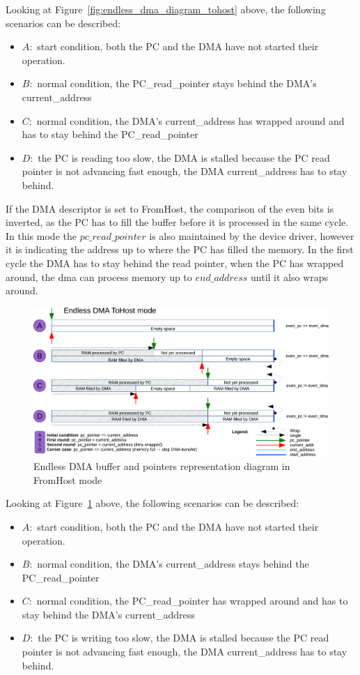 Looking at Figure~\ref{fig:endless_dma_diagram_tohost} above, the following scenarios can be described:
\begin{itemize}
	\item $A:$ start condition, both the PC and the DMA have not started their operation.
	\item $B:$ normal condition, the PC\_read\_pointer stays behind the DMA's current\_address
	\item $C:$ normal condition, the DMA's current\_address has wrapped around and has to stay behind the PC\_read\_pointer
	\item $D:$ the PC is reading too slow, the DMA is stalled because the PC read pointer is not advancing fast enough, the DMA current\_address has to stay behind.
\end{itemize}

\newpage
If the DMA descriptor is set to FromHost, the comparison of the even bits is inverted, as the PC has to fill the buffer before it is processed in the same cycle. In this mode the $pc\_read\_pointer$ is also maintained by the device driver, however it is indicating the address up to where the PC has filled the memory. In the first cycle the DMA has to stay behind the read pointer, when the PC has wrapped around, the dma can process memory up to $end\_address$ until it also wraps around.

\begin{figure}[H]
	\centering
	\includegraphics[width=1\textwidth, page=2]{figures/Endless_DMA_diagram.pdf}
	\caption{Endless DMA buffer and pointers representation diagram in FromHost mode}
	\label{fig:endless_dma_diagram_fromhost}
\end{figure}
Looking at Figure~\ref{fig:endless_dma_diagram_fromhost} above, the following scenarios can be described:
\begin{itemize}
	\item $A:$ start condition, both the PC and the DMA have not started their operation.
	\item $B:$ normal condition, the DMA's current\_address stays behind the PC\_read\_pointer 
	\item $C:$ normal condition, the PC\_read\_pointer has wrapped around and has to stay behind the DMA's current\_address 
	\item $D:$ the PC is writing too slow, the DMA is stalled because the PC read pointer is not advancing fast enough, the DMA current\_address has to stay behind.
\end{itemize}

